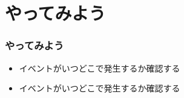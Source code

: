  \section{やってみよう}
\begin{frame}[containsverbatim]
 \frametitle{やってみよう}
 \begin{itemize}
  \item {}イベントがいつどこで発生するか確認する
  \item {}イベントがいつどこで発生するか確認する
 \end{itemize}
\end{frame}

\begin{frame}[containsverbatim]
 \frametitle{}
\end{frame}
